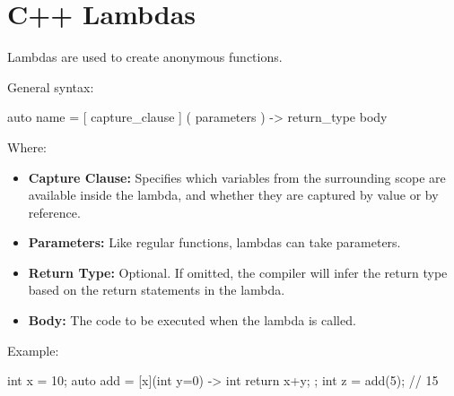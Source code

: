 \documentclass{report}
\begin{document}
    \section{C++ Lambdas}
    \bigbreak \noindent 
    \begin{concept}
       Lambdas are used to create anonymous functions. 
    \end{concept}
    \bigbreak \noindent 
    General syntax:
    \bigbreak \noindent 
    \begin{cppcode}
auto name = [ capture_clause ] ( parameters ) -> return_type { body }
    \end{cppcode}
    \bigbreak \noindent 
    Where:
    \begin{itemize}
        \item \textbf{Capture Clause:} Specifies which variables from the surrounding scope are available inside the lambda, and whether they are captured by value or by reference.
        \item \textbf{Parameters:} Like regular functions, lambdas can take parameters.
        \item \textbf{Return Type:} Optional. If omitted, the compiler will infer the return type based on the return statements in the lambda.
        \item \textbf{Body:} The code to be executed when the lambda is called.
    \end{itemize}

    \bigbreak \noindent 
    Example:
    \bigbreak \noindent 
    \begin{cppcode}
int x = 10;
auto add = [x](int y=0) -> int { return x+y; };
int z  = add(5);  // 15
    \end{cppcode}
    \bigbreak \noindent 
\end{document}
